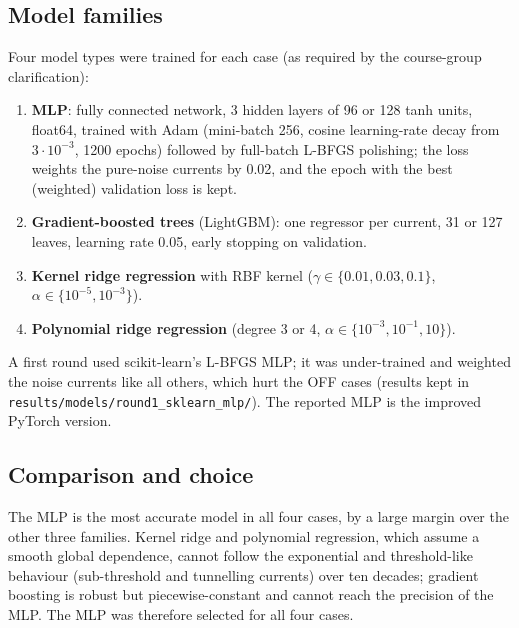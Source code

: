 \subsection{Model families}
Four model types were trained for each case (as required by the course-group clarification):
\begin{enumerate}[nosep]
\item \textbf{MLP}: fully connected network, 3 hidden layers of 96 or 128 tanh units, float64, trained with Adam (mini-batch 256, cosine learning-rate decay from $3\cdot10^{-3}$,
      1200 epochs) followed by full-batch L-BFGS polishing; the loss weights the pure-noise currents by 0.02, and the epoch with the best (weighted) validation loss is kept.
\item \textbf{Gradient-boosted trees} (LightGBM): one regressor per current, 31 or 127 leaves, learning rate 0.05, early stopping on validation.
\item \textbf{Kernel ridge regression} with RBF kernel ($\gamma\in\{0.01,0.03,0.1\}$, $\alpha\in\{10^{-5},10^{-3}\}$).
\item \textbf{Polynomial ridge regression} (degree 3 or 4, $\alpha\in\{10^{-3},10^{-1},10\}$).
\end{enumerate}
A first round used scikit-learn's L-BFGS MLP; it was under-trained and weighted the noise currents like all others, which hurt the OFF cases
(results kept in \texttt{results/models/round1\_sklearn\_mlp/}). The reported MLP is the improved PyTorch version.

\subsection{Comparison and choice}

The MLP is the most accurate model in all four cases, by a large margin over the other three families. Kernel ridge and polynomial regression, which assume
a smooth global dependence, cannot follow the exponential and threshold-like behaviour (sub-threshold and tunnelling currents) over ten decades;
gradient boosting is robust but piecewise-constant and cannot reach the precision of the MLP. The MLP was therefore selected for all four cases.

